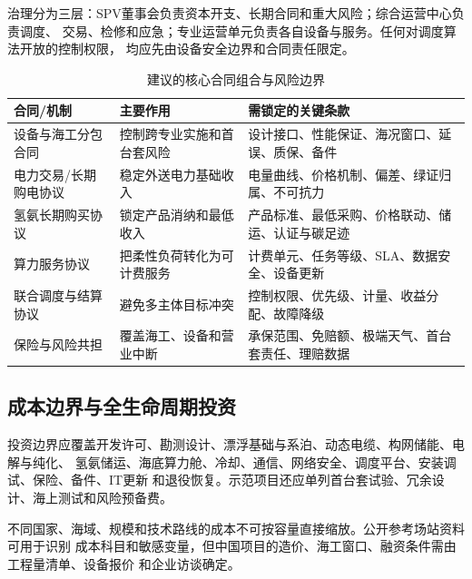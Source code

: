治理分为三层：SPV董事会负责资本开支、长期合同和重大风险；综合运营中心负责调度、
交易、检修和应急；专业运营单元负责各自设备与服务。任何对调度算法开放的控制权限，
均应先由设备安全边界和合同责任限定。

\begin{table}[H]
\centering
\caption{建议的核心合同组合与风险边界}
\label{tab:c6-contracts}
\small
\begin{tabularx}{\textwidth}{p{2.8cm} X X}
\toprule
合同/机制 & 主要作用 & 需锁定的关键条款\\
\midrule
设备与海工分包合同 & 控制跨专业实施和首台套风险 & 设计接口、性能保证、海况窗口、延误、质保、备件\\
电力交易/长期购电协议 & 稳定外送电力基础收入 & 电量曲线、价格机制、偏差、绿证归属、不可抗力\\
氢氨长期购买协议 & 锁定产品消纳和最低收入 & 产品标准、最低采购、价格联动、储运、认证与碳足迹\\
算力服务协议 & 把柔性负荷转化为可计费服务 & 计费单元、任务等级、SLA、数据安全、设备更新\\
联合调度与结算协议 & 避免多主体目标冲突 & 控制权限、优先级、计量、收益分配、故障降级\\
保险与风险共担 & 覆盖海工、设备和营业中断 & 承保范围、免赔额、极端天气、首台套责任、理赔数据\\
\bottomrule
\end{tabularx}
\end{table}

\subsection{成本边界与全生命周期投资}

投资边界应覆盖开发许可、勘测设计、漂浮基础与系泊、动态电缆、构网储能、电解与纯化、
氢氨储运、海底算力舱、冷却、通信、网络安全、调度平台、安装调试、保险、备件、IT更新
和退役恢复。示范项目还应单列首台套试验、冗余设计、海上测试和风险预备费。

不同国家、海域、规模和技术路线的成本不可按容量直接缩放。公开参考场站资料可用于识别
成本科目和敏感变量，但中国项目的造价、海工窗口、融资条件需由工程量清单、设备报价
和企业访谈确定\cite{nrel-cost-review}。

